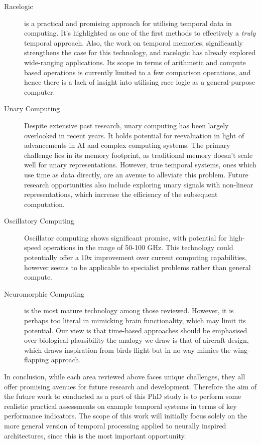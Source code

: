 \documentclass{article}
\begin{document}
\begin{description}

\item[Racelogic] is a practical and promising approach for utilising temporal data in computing. It's highlighted as one of the first methods to effectively a \textit{truly} temporal approach. Also, the work on temporal memories, significantly strengthens the case for this technology, and racelogic has already explored wide-ranging applications. Its scope in terms of arithmetic and compute based operations is currently limited to a few comparison operations, and hence there is a lack of insight into utilising race logic as a general-purpose computer. 

\item[Unary Computing] Despite extensive past research, unary computing has been largely overlooked in recent years. It holds potential for reevaluation in light of advancements in AI and complex computing systems. The primary challenge lies in its memory footprint, as traditional memory doesn't scale well for unary representations. However, true temporal systems, ones which use time as data directly, are an avenue to alleviate this problem. Future research opportunities also include exploring unary signals with non-linear representations, which increase the efficiency of the subsequent computation.

\item[Oscillatory Computing] Oscillator computing shows significant promise, with potential for high-speed operations in the range of 50-100 GHz. This technology could potentially offer a 10x improvement over current computing capabilities, however seems to be applicable to specialist problems rather than general compute.

\item[Neuromorphic Computing] is the most mature technology among those reviewed. However, it is perhaps too literal in mimicking brain functionality, which may limit its potential. Our view is that time-based approaches should be emphasised over biological plausibility the analogy we draw is that of aircraft design, which draws inspiration from birds flight but in no way mimics the wing-flapping approach. 
\end{description}

In conclusion, while each area reviewed above faces unique challenges, they all offer promising avenues for future research and development. Therefore the aim of the future work to conducted as a part of this PhD study is to perform some realistic practical assessments on example temporal systems in terms of key performance indicators. The scope of this work will initially focus solely on the more general version of temporal processing applied to neurally inspired architectures, since this is the most important opportunity.
\end{document}
